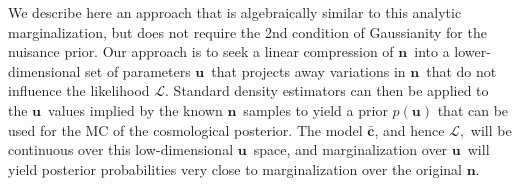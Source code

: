 \documentclass[onecolumn,resetfootnote]{aastex7}
\newcommand{\vecn}{\ensuremath{\mathbf{n}}}
\newcommand{\vecu}{\ensuremath{\mathbf{u}}}
\newcommand{\hatc}{\ensuremath{\bar{\mathbf{c}}}}
\newcommand{\likeli}{\mathcal{L}}
\begin{document}
We describe here an approach that is algebraically similar to this analytic marginalization,
but does not require the 2nd condition of Gaussianity for
the nuisance prior.
Our approach is to seek a linear compression of \vecn\ into a lower-dimensional
set of parameters \vecu\ that projects away variations in \vecn\ that do not
influence the likelihood $\likeli.$  Standard density estimators can then be
applied to the \vecu\ values implied by the known \vecn\ samples to yield a
prior $p(\vecu)$ that can be used for the MC of the cosmological posterior.  The
model \hatc, and hence $\likeli,$ will be continuous over this low-dimensional
\vecu\ space, and marginalization over \vecu\ will yield posterior probabilities
very close to marginalization over the original \vecn.  
\end{document}
